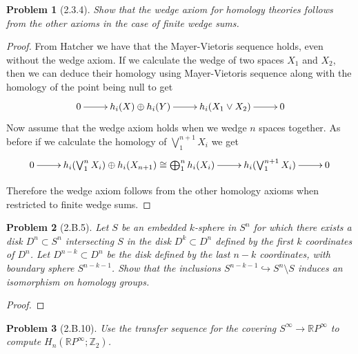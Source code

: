 \documentclass[10pt]{article}
\newcommand{\sk}{\vskip 10mm}
\newcommand{\bb}[1]{\mathbb{#1}}
\theoremstyle{plain}
\newtheorem{problem}{Problem}
\theoremstyle{remark}
\begin{document}
\sk

\begin{problem}[2.3.4]
  Show that the wedge axiom for homology theories follows from the other
  axioms in the case of finite wedge sums.
\end{problem}

\begin{proof}
  From Hatcher we have that the Mayer-Vietoris sequence holds, even without
  the wedge axiom. If we calculate the wedge of two spaces $X_1$ and $X_2$, then
  we can deduce their homology using
  Mayer-Vietoris sequence along with the homology of the point being null to
  get
  \[
    \xymatrix{
      0 \ar[r] & h_i(X)\oplus h_i(Y) \ar[r] & h_i(X_1\vee X_2) \ar[r] & 0
    }
  \]
  Now assume that the wedge axiom holds when we wedge $n$ spaces together. As before
  if we calculate the homology of $\bigvee_1^{n+1}X_{i}$ we get
  \[
    \xymatrix{
      0 \ar[r] & h_i(\bigvee_1^n X_i)\oplus h_i(X_{n+1})\cong\bigoplus_1^n h_i(X_i) \ar[r] & h_i(\bigvee_1^{n+1}X_i) \ar[r] & 0
    }
  \]

  Therefore the wedge axiom follows from the other homology axioms when restricted
  to finite wedge sums.
\end{proof}

\sk

\begin{problem}[2.B.5]
  Let $S$ be an embedded $k$-sphere in $S^n$ for which there exists a disk
  $D^n\subset S^n$ intersecting $S$ in the disk $D^k\subset D^n$ defined by the
  first $k$ coordinates of $D^n$. Let $D^{n-k}\subset D^n$ be the disk defined
  by the last $n-k$ coordinates, with boundary sphere $S^{n-k-1}$. Show that the
  inclusions $S^{n-k-1}\hookrightarrow S^n\setminus S$ induces an isomorphism on
  homology groups.
\end{problem}

\begin{proof}
  
\end{proof}

\sk

\begin{problem}[2.B.10]
  Use the transfer sequence for the covering $S^\infty\rightarrow\bb{R}P^\infty$
  to compute  $H_n(\bb{R}P^\infty;\bb{Z}_2)$.
\end{problem}
\end{document}
